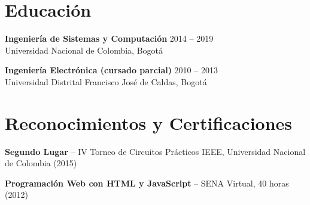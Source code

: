 \documentclass[11pt,a4paper]{article}
\begin{document}
\section{Educaci\'{o}n}

\textbf{Ingenier\'{i}a de Sistemas y Computaci\'{o}n} \hfill 2014 -- 2019 \\
Universidad Nacional de Colombia, Bogot\'{a}

\vspace{6pt}

\textbf{Ingenier\'{i}a Electr\'{o}nica (cursado parcial)} \hfill 2010 -- 2013 \\
Universidad Distrital Francisco Jos\'{e} de Caldas, Bogot\'{a}

\section{Reconocimientos y Certificaciones}

\textbf{Segundo Lugar} -- IV Torneo de Circuitos Pr\'{a}cticos IEEE, Universidad Nacional de Colombia (2015)

\textbf{Programaci\'{o}n Web con HTML y JavaScript} -- SENA Virtual, 40 horas (2012)
\end{document}
